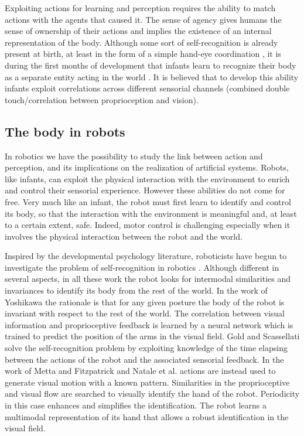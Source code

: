Exploiting actions for learning and perception requires the ability to
match actions with the agents that caused it. The sense of agency
\cite{jeannerod02mechanism} gives humans the sense of ownership of
their actions and implies the existence of an internal representation
of the body. Although some sort of self-recognition is already present
at birth, at least in the form of a simple hand-eye coordination
\cite{meer95thefunctional}, it is during the first months of
development that infants learn to recognize their body as a separate
entity acting in the world \cite{rochat00perceived}. It is believed
that to develop this ability infants exploit correlations across
different sensorial channels (combined double touch/correlation
between proprioception and vision).


\subsection{The body in robots}

In robotics we have the possibility to study the link between action
and perception, and its implications on the realization of artificial
systems. Robots, like infants, can exploit the physical interaction with
the environment to enrich and control their sensorial
experience. However these abilities do not come for free. Very much
like an infant, the robot must first learn to identify and control its
body, so that the interaction with the environment is meaningful and,
at least to a certain extent, safe. Indeed, motor control is
challenging especially when it involves the physical interaction
between the robot and the world.

Inspired by the developmental psychology literature, roboticists have
begun to investigate the problem of self-recognition in robotics
\cite{yoshikawa03doestheinvariance,metta03early,natale05exploring,gold05learning}. Although
different in several aspects, in all these work the robot looks for
intermodal similarities and invariances to identify its body from the
rest of the world.  In the work of Yoshikawa
\cite{yoshikawa03doestheinvariance} the rationale is that for any
given posture the body of the robot is invariant with respect to the
rest of the world. The correlation between visual information and
proprioceptive feedback is learned by a neural network which is trained
to predict the position of the arms in the visual field.  Gold and
Scassellati \cite{gold05learning} solve the self-recognition problem
by exploiting knowledge of the time elapsing between the actions of
the robot and the associated sensorial feedback.  In the work of Metta
and Fitzpatrick \cite{metta03early} and Natale et
al. \cite{natale05exploring} actions are instead used to generate
visual motion with a known pattern. Similarities in the proprioceptive
and visual flow are searched to visually identify the hand of the
robot. Periodicity in this case enhances and simplifies the
identification. The robot learns a multimodal representation of its
hand that allows a robust identification in the visual field.

